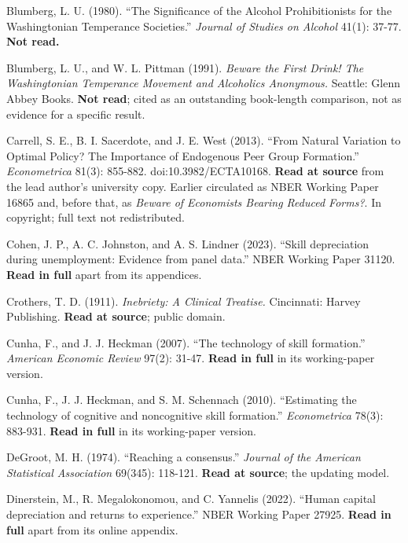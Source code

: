 \documentclass[11pt,a4paper]{article}
\begin{document}
\begin{list}{}{\setlength{\leftmargin}{1.5em}\setlength{\itemindent}{-1.5em}\setlength{\itemsep}{2pt}}
\item Blumberg, L. U. (1980). ``The Significance of the Alcohol Prohibitionists for the Washingtonian Temperance Societies.'' \textit{Journal of Studies on Alcohol} 41(1): 37-77. \textbf{Not read.}

\item Blumberg, L. U., and W. L. Pittman (1991). \textit{Beware the First Drink! The Washingtonian Temperance Movement and Alcoholics Anonymous.} Seattle: Glenn Abbey Books. \textbf{Not read}; cited as an outstanding book-length comparison, not as evidence for a specific result.

\item Carrell, S. E., B. I. Sacerdote, and J. E. West (2013). ``From Natural Variation to Optimal Policy? The Importance of Endogenous Peer Group Formation.'' \textit{Econometrica} 81(3): 855-882. doi:10.3982/ECTA10168. \textbf{Read at source} from the lead author's university copy. Earlier circulated as NBER Working Paper 16865 and, before that, as \textit{Beware of Economists Bearing Reduced Forms?}. In copyright; full text not redistributed.

\item Cohen, J. P., A. C. Johnston, and A. S. Lindner (2023). ``Skill depreciation during unemployment: Evidence from panel data.'' NBER Working Paper 31120. \textbf{Read in full} apart from its appendices.

\item Crothers, T. D. (1911). \textit{Inebriety: A Clinical Treatise.} Cincinnati: Harvey Publishing. \textbf{Read at source}; public domain.

\item Cunha, F., and J. J. Heckman (2007). ``The technology of skill formation.'' \textit{American Economic Review} 97(2): 31-47. \textbf{Read in full} in its working-paper version.

\item Cunha, F., J. J. Heckman, and S. M. Schennach (2010). ``Estimating the technology of cognitive and noncognitive skill formation.'' \textit{Econometrica} 78(3): 883-931. \textbf{Read in full} in its working-paper version.

\item DeGroot, M. H. (1974). ``Reaching a consensus.'' \textit{Journal of the American Statistical Association} 69(345): 118-121. \textbf{Read at source}; the updating model.

\item Dinerstein, M., R. Megalokonomou, and C. Yannelis (2022). ``Human capital depreciation and returns to experience.'' NBER Working Paper 27925. \textbf{Read in full} apart from its online appendix.


\end{list}
\end{document}
